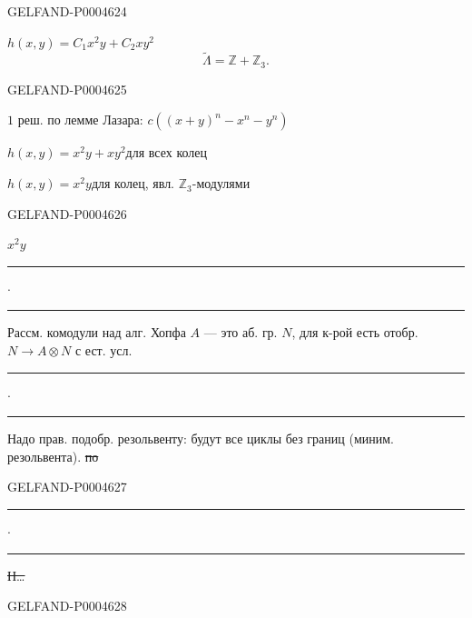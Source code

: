 \begin{GelfandAdjacentEvidence}{GELFAND-P000462}{4}


\quad $h(x,y)=C_1x^2y+C_2xy^2$
\[
\widetilde\Lambda=\mathbb Z+\mathbb Z_3.
\]
\end{GelfandAdjacentEvidence}
\begin{GelfandAdjacentEvidence}{GELFAND-P000462}{5}


$1$ реш. по лемме Лазара: $c((x+y)^n-x^n-y^n)$

$h(x,y)=x^2y+xy^2$\qquad для всех колец

$h(x,y)=x^2y$\qquad для колец, явл. $\mathbb Z_3$-модулями
\end{GelfandAdjacentEvidence}
\begin{GelfandAdjacentEvidence}{GELFAND-P000462}{6}


\noindent\hspace*{1.7em}$x^2y$

\begin{center}
\rule[.5ex]{26mm}{.35pt}\enspace$\cdot$\enspace\rule[.5ex]{27mm}{.35pt}
\end{center}
Рассм. комодули над алг. Хопфа $A$ — это аб. гр. $N$, для к-рой есть отобр. $N\longrightarrow A\otimes N$ с ест. усл.
\begin{center}
\rule[.5ex]{25mm}{.35pt}\enspace$\cdot$\enspace\rule[.5ex]{29mm}{.35pt}
\end{center}

Надо прав. подобр. резольвенту: будут все циклы без границ (миним. резольвента). \sout{по}
\end{GelfandAdjacentEvidence}
\begin{GelfandAdjacentEvidence}{GELFAND-P000462}{7}

\begin{center}
\rule[.5ex]{26mm}{.35pt}\enspace$\cdot$\enspace\rule[.5ex]{29mm}{.35pt}
\end{center}

\sout{Н\ldots}
\end{GelfandAdjacentEvidence}
\begin{GelfandAdjacentEvidence}{GELFAND-P000462}{8}

\end{GelfandAdjacentEvidence}
